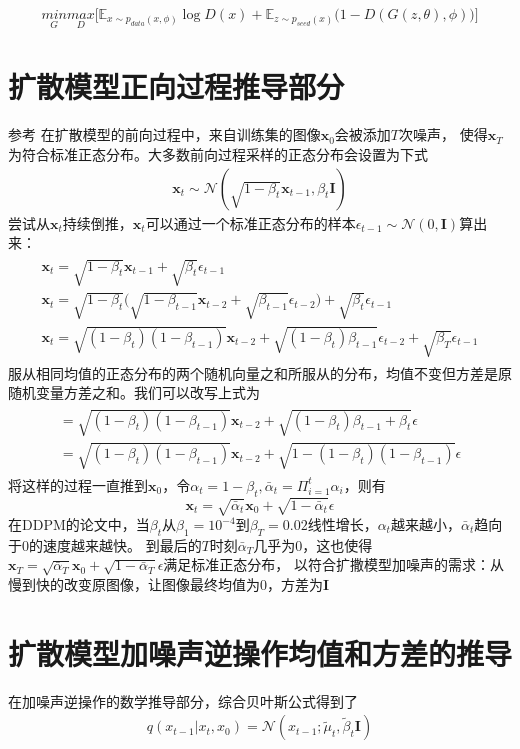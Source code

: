 \begin{equation}
    \underset{G}{min}\underset{D}{max}\Big[\mathbb{E}_{x\sim p_{data}(x,\phi)}\log D(x)+\mathbb{E}_{z\sim p_{seed}(x)}\big(1-D(G(z,\theta),\phi)\big)\Big]
\end{equation}

\section{扩散模型正向过程推导部分}
参考\cite{luo2022understanding}\cite{weng2021diffusion}
在扩散模型的前向过程中，来自训练集的图像$\mathbf{x}_0$会被添加$T$次噪声，
使得$\mathbf{x}_T$为符合标准正态分布。大多数前向过程采样的正态分布会设置为下式
\begin{align*}
    \mathbf{x}_t\sim\mathcal{N}(\sqrt{1-\beta_t}\mathbf{x}_{t-1},\beta_t\mathbf{I})
\end{align*}
尝试从$\mathbf{x}_t$持续倒推，$\mathbf{x}_t$可以通过一个标准正态分布的样本$\epsilon_{t-1}\sim\mathcal{N}(0,\mathbf{I})$算出来：
\begin{align*}
    \begin{split}
        \mathbf{x}_t=\sqrt{1-\beta_t}\mathbf{x}_{t-1}+\sqrt{\beta_t}\epsilon_{t-1}\\
        \mathbf{x}_t=\sqrt{1-\beta_t}\Big(\sqrt{1-\beta_{t-1}}\mathbf{x}_{t-2}+\sqrt{\beta_{t-1}}\epsilon_{t-2}\Big)+\sqrt{\beta_t}\epsilon_{t-1}\\
        \mathbf{x}_t=\sqrt{(1-\beta_t)(1-\beta_{t-1})}\mathbf{x}_{t-2}+\sqrt{(1-\beta_t)\beta_{t-1}}\epsilon_{t-2}+\sqrt{\beta_T}\epsilon_{t-1}
    \end{split}
\end{align*}
服从相同均值的正态分布的两个随机向量之和所服从的分布，均值不变但方差是原随机变量方差之和。我们可以改写上式为
\begin{align*}
    \begin{split}
        =\sqrt{(1-\beta_t)(1-\beta_{t-1})}\mathbf{x}_{t-2}+\sqrt{(1-\beta_t)\beta_{t-1}+\beta_t}\epsilon\\
        =\sqrt{(1-\beta_t)(1-\beta_{t-1})}\mathbf{x}_{t-2}+\sqrt{1-(1-\beta_t)(1-\beta_{t-1})}\epsilon
    \end{split}
\end{align*}
将这样的过程一直推到$\mathbf{x}_0$，令$\alpha_t=1-\beta_t,\bar{\alpha}_t=\Pi_{i=1}^t\alpha_i$，则有
\begin{equation}
    \mathbf{x}_t=\sqrt{\bar{\alpha}_t}\mathbf{x}_0+\sqrt{1-\bar{\alpha}_t}\epsilon
\end{equation}
在DDPM的论文中，当$\beta_t$从$\beta_1=10^{-4}$到$\beta_T=0.02$线性增长，$\alpha_t$越来越小，$\bar{\alpha}_t$趋向于0的速度越来越快。
到最后的$T$时刻$\bar{\alpha}_T$几乎为0，这也使得$\mathbf{x}_T=\sqrt{\bar{\alpha}_T}\mathbf{x}_0+\sqrt{1-\bar{\alpha}_T}\epsilon$满足标准正态分布，
以符合扩撒模型加噪声的需求：从慢到快的改变原图像，让图像最终均值为$0$，方差为$\mathbf{I}$

\section{扩散模型加噪声逆操作均值和方差的推导}
在加噪声逆操作的数学推导部分，综合贝叶斯公式得到了
\begin{align*}
    q(x_{t-1}|x_t,x_0)=\mathcal{N}(x_{t-1};\tilde{\mu}_t,\tilde{\beta}_t\mathbf{I})
\end{align*}
